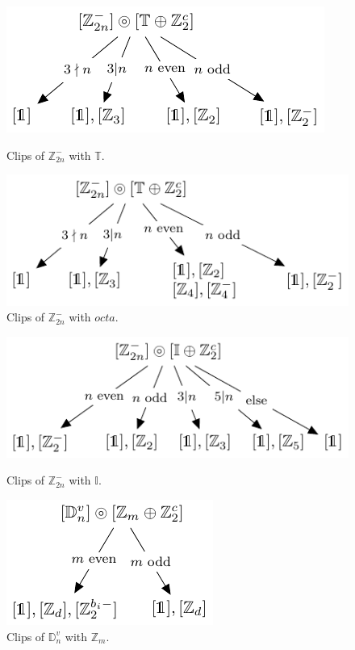 \documentclass[11pt,a4paper]{amsart}
\theoremstyle{definition}
\newcommand{\ZZ}{\mathbb{Z}}                %
\newcommand{\ico}{\mathbb{I}}               %
\newcommand{\tetra}{\mathbb{T}}             %
\newcommand{\DD}{\mathbb{D}}                %
\newcommand{\1}{\mathds{1}}		            %
\begin{document}
\begin{figure}[h!]
	\begin{minipage}[b]{0.5\linewidth}
		\centering \includegraphics[width=0.8\linewidth]{"Figures piezo/graphe3"}
		\caption{Clips of $\ZZ_{2n}^-$ with $\tetra$.}
		\label{fig:graphe3}
	\end{minipage}\hfill
	\begin{minipage}[b]{0.5\linewidth}
		\centering \includegraphics[width=0.8\linewidth]{"Figures piezo/graphe4"}
		\caption{Clips of $\ZZ_{2n}^-$ with $octa$.}
		\label{fig:graphe4}
	\end{minipage}
\end{figure}

\begin{figure}[h!]
	\begin{minipage}[b]{0.5\linewidth}
		\centering \includegraphics[width=0.8\linewidth]{"Figures piezo/graphe5"}
		\caption{Clips of $\ZZ_{2n}^-$ with $\ico$.}
		\label{fig:graphe5}
	\end{minipage}\hfill
	\begin{minipage}[b]{0.5\linewidth}
		\centering \includegraphics[width=0.6\linewidth]{"Figures piezo/graphe6'"}
		\caption{Clips of $\DD_n^v$ with $\ZZ_m$.}
		\label{fig:graphe6}
	\end{minipage}
\end{figure}
\end{document}
